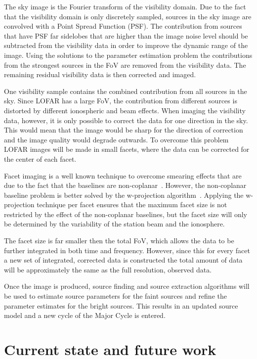 \documentclass[journal]{IEEEtran}
\begin{document}
The sky image is the Fourier transform of the visibility domain. Due to the fact that the visibility domain is only discretely sampled, sources in the sky image are convolved with a Point Spread Function (PSF). The contribution from sources that have PSF far sidelobes that are higher than the image noise level should be subtracted from the visibility data in order to improve the dynamic range of the image. Using the solutions to the parameter estimation problem the contributions from the strongest sources in the FoV are removed from the visibility data. The remaining residual visibility data is then corrected and imaged.

One visibility sample contains the combined contribution from all sources in the sky. Since LOFAR has a large FoV, the contribution from different sources is distorted by different ionospheric and beam effects. When imaging the visibility data, however, it is only possible to correct the data for one direction in the sky. This would mean that the image would be sharp for the direction of correction and the image quality would degrade outwards. To overcome this problem LOFAR images will be made in small facets, where the data can be corrected for the center of each facet. 

Facet imaging is a well known technique to overcome smearing effects that are due to the fact that the baselines are non-coplanar~\cite{SIRAII:99}. However, the non-coplanar baseline problem is better solved by the w-projection algorithm~\cite{Cornwell:05}. Applying the w-projection technique per facet ensures that the maximum facet size is not restricted by the effect of the non-coplanar baselines, but the facet size will only be determined by the variability of the station beam and the ionosphere.

The facet size is far smaller then the total FoV, which allows the data to be further integrated in both time and frequency. However, since this for every facet a new set of integrated, corrected data is constructed the total amount of data will be approximately the same as the full resolution, observed data.
  
Once the image is produced, source finding and source extraction algorithms will be used to estimate source parameters for the faint sources and refine the parameter estimates for the bright sources. This results in an updated source model and a new cycle of the Major Cycle is entered. 

\section{Current state and future work}
\end{document}
